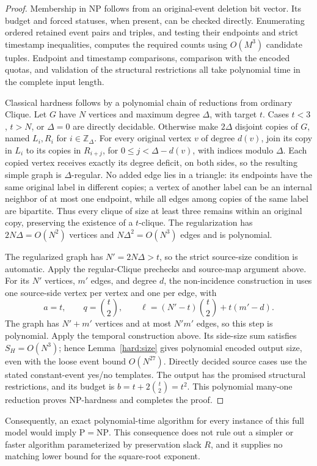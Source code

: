 \begin{proof}
Membership in NP follows from an original-event deletion bit vector.
Its budget and forced statuses, when present, can be checked directly.
Enumerating ordered retained event pairs and triples, and testing their
endpoints and strict timestamp inequalities, computes the required counts
using \(O(M^3)\) candidate tuples. Endpoint and timestamp comparisons,
comparison with the encoded quotas, and validation of the structural
restrictions all take polynomial time in the complete input length.

Classical hardness follows by a polynomial chain of reductions from ordinary Clique.
Let \(G\) have \(N\) vertices and maximum degree \(\Delta\), with target
\(t\). Cases \(t<3\), \(t>N\), or \(\Delta=0\) are directly decidable.
Otherwise make \(2\Delta\) disjoint copies of \(G\), named \(L_i,R_i\)
for \(i\in\mathbb Z_\Delta\). For every original vertex \(v\) of degree
\(d(v)\), join its copy in \(L_i\) to its copies in \(R_{i+j}\), for
\(0\le j<\Delta-d(v)\), with indices modulo \(\Delta\).
Each copied vertex receives exactly its degree deficit, on both sides,
so the resulting simple graph is \(\Delta\)-regular. No added edge lies
in a triangle: its endpoints have the same original label in different
copies; a vertex of another label can be an internal neighbor of at most
one endpoint, while all edges among copies of the same label are
bipartite. Thus every clique of size at least three remains within an
original copy, preserving the existence of a \(t\)-clique.
The regularization has \(2N\Delta=O(N^2)\) vertices and
\(N\Delta^2=O(N^3)\) edges and is polynomial.

The regularized graph has \(N'=2N\Delta>t\), so the strict source-size
condition is automatic. Apply the regular-Clique prechecks and source-map
argument above. For its \(N'\) vertices, \(m'\) edges, and degree \(d\),
the non-incidence construction in \cite[Theorem~10]{mkrtchyan2024}
uses one source-side vertex per vertex and one per edge, with
\[
 a=t,\qquad q=\binom{t}{2},\qquad
 \ell=(N'-t)\binom{t}{2}+t(m'-d).
\]
The graph has \(N'+m'\) vertices and at most \(N'm'\) edges, so this
step is polynomial. Apply the temporal construction above.
Its side-size sum satisfies \(S_H=O(N^3)\); hence
Lemma~\ref{hard:size} gives polynomial encoded output size, even with
the loose event bound \(O(N^{27})\). Directly decided source cases use
the stated constant-event yes/no templates. The output has the promised
structural restrictions, and its budget is
\(b=t+2\binom{t}{2}=t^2\).
This polynomial many-one reduction proves NP-hardness and completes
the proof.
\end{proof}

Consequently, an exact polynomial-time algorithm for every instance of
this full model would imply \(\mathrm P=\mathrm{NP}\). This consequence
does not rule out a simpler or faster algorithm parameterized by
preservation slack \(R\), and it supplies no matching lower bound for
the square-root exponent.
